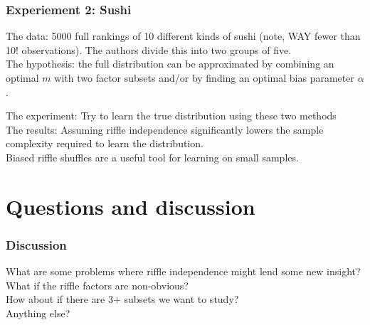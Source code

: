 \documentclass{beamer} %
\theoremstyle{definition} %
\def \pausenl {\pause $ \ $\\}
\begin{document}
\begin{frame}
	\frametitle{Experiement 2: Sushi}
	The data: 5000 full rankings of 10 different kinds of sushi (note, WAY fewer than 10! observations).  The authors divide this into two groups of five. \\\pause
	The hypothesis: the full distribution can be approximated by combining an optimal $m$ with two factor subsets and/or by finding an optimal bias parameter $\alpha$.\\\pause
	
	The experiment: Try to learn the true distribution using these two methods\\
	\pausenl
	
	The results:  Assuming riffle independence significantly lowers the sample complexity required to learn the distribution.\\
	\pause Biased riffle shuffles are a useful tool for learning on small samples.
\end{frame}

\section{Questions and discussion}
\begin{frame}
	\frametitle{Discussion}
	What are some problems where riffle independence might lend some new insight?\\$\ $\\
	
	What if the riffle factors are non-obvious?\\$\ $\\
	
	How about if there are 3+ subsets we want to study?\\$\ $\\
	
	Anything else?
	\end{frame}
\end{document}
